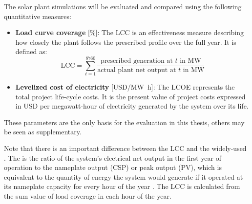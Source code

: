
The solar plant simulations will be evaluated and compared using the following quantitative measures:
\begin{itemize}
\item \textbf{Load curve coverage} [\si{\percent}]: The \ac{LCC} is an effectiveness measure describing how closely the plant follows the prescribed profile over the full year. It is defined as:
\begin{equation}
\mbox{LCC} = \sum\limits_{t=1}^{8760} \frac{\mbox{prescribed generation at }t\mbox{ in MW}}{\mbox{actual plant net output at }t\mbox{ in MW}} \label{GL_GCC}
\end{equation} 
\item \textbf{Levelized cost of electricity} [USD/\si{\mega\watt\hour}]: The \acf{LCOE} represents the total project life-cycle costs. It is the present value of project costs expressed in USD per megawatt-hour of electricity generated by the system over its life.
\end{itemize}

These parameters are the only basis for the evaluation in this thesis, others may be seen as supplementary. 


Note that there is an important difference between the \ac{LCC} and the widely-used . The  is the ratio of the system's electrical net output in the first year of operation to the nameplate output (\ac{CSP}) or peak output (\ac{PV}), which is equivalent to the quantity of energy the system would generate if it operated at its nameplate capacity for every hour of the year \cite{NREL2015a}. The \ac{LCC} is calculated from the sum value of load coverage in each hour of the year. 
